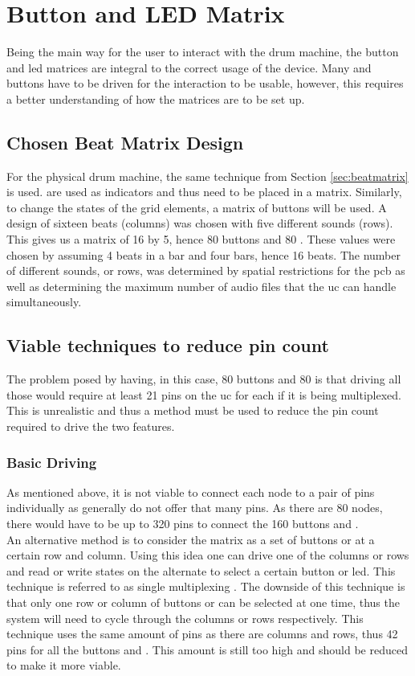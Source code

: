 \documentclass[12pt,a4paper]{report}
\begin{document}
\section{Button and LED Matrix}
Being the main way for the user to interact with the drum machine, the button and \ac{led} matrices are integral to the correct usage of the device. Many  and buttons have to be driven for the interaction to be usable, however, this requires a better understanding of how the matrices are to be set up.
\subsection{Chosen Beat Matrix Design} 
For the physical drum machine, the same technique from Section \ref{sec:beatmatrix} is used.  are used as indicators and thus need to be placed in a matrix. Similarly, to change the states of the grid elements, a matrix of buttons will be used. A design of sixteen beats (columns) was chosen with five different sounds (rows). This gives us a matrix of 16 by 5, hence 80 buttons and 80 . These values were chosen by assuming 4 beats in a bar and four bars, hence 16 beats. The number of different sounds, or rows, was determined by spatial restrictions for the \ac{pcb} \cite{pcbguidelines} as well as determining the maximum number of audio files that the \ac{uc} can handle simultaneously.
\subsection{Viable techniques to reduce pin count} \label{sec:pincountReduc}
The problem posed by having, in this case, 80 buttons and 80  is that driving all those would require at least 21 pins on the \ac{uc} for each if it is being multiplexed. This is unrealistic and thus a method must be used to reduce the pin count required to drive the two features.
\subsubsection{Basic Driving}
As mentioned above, it is not viable to connect each node to a pair of pins individually as  generally do not offer that many pins. As there are 80 nodes, there would have to be up to 320 pins to connect the 160 buttons and .\\
An alternative method is to consider the matrix as a set of buttons or  at a certain row and column. Using this idea one can drive one of the columns or rows and read or write states on the alternate to select a certain button or \ac{led}. This technique is referred to as single multiplexing \cite{singleMultiplex}. The downside of this technique is that only one row or column of buttons or  can be selected at one time, thus the system will need to cycle through the columns or rows respectively. This technique uses the same amount of pins as there are columns and rows, thus 42 pins for all the buttons and . This amount is still too high and should be reduced to make it more viable.
\end{document}
